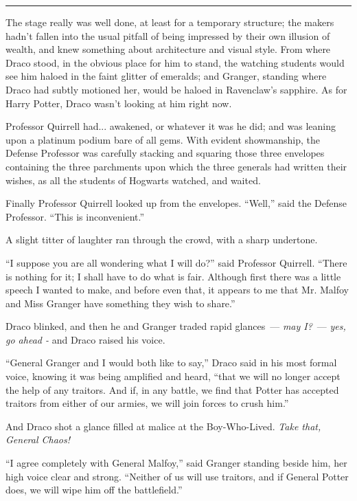 \begin{center}\rule{3in}{0.4pt}\end{center}

The stage really was well done, at least for a temporary structure; the makers hadn't fallen into the usual pitfall of being impressed by their own illusion of wealth, and knew something about architecture and visual style. From where Draco stood, in the obvious place for him to stand, the watching students would see him haloed in the faint glitter of emeralds; and Granger, standing where Draco had subtly motioned her, would be haloed in Ravenclaw's sapphire. As for Harry Potter, Draco wasn't looking at him right now.

Professor Quirrell had... awakened, or whatever it was he did; and was leaning upon a platinum podium bare of all gems. With evident showmanship, the Defense Professor was carefully stacking and squaring those three envelopes containing the three parchments upon which the three generals had written their wishes, as all the students of Hogwarts watched, and waited.

Finally Professor Quirrell looked up from the envelopes. ``Well,'' said the Defense Professor. ``This is inconvenient.''

A slight titter of laughter ran through the crowd, with a sharp undertone.

``I suppose you are all wondering what I will do?'' said Professor Quirrell. ``There is nothing for it; I shall have to do what is fair. Although first there was a little speech I wanted to make, and before even that, it appears to me that Mr. Malfoy and Miss Granger have something they wish to share.''

Draco blinked, and then he and Granger traded rapid glances~--- \emph{may I?}~--- \emph{yes, go ahead -} and Draco raised his voice.

``General Granger and I would both like to say,'' Draco said in his most formal voice, knowing it was being amplified and heard, ``that we will no longer accept the help of any traitors. And if, in any battle, we find that Potter has accepted traitors from either of our armies, we will join forces to crush him.''

And Draco shot a glance filled at malice at the Boy-Who-Lived. \emph{Take that, General Chaos!}

``I agree completely with General Malfoy,'' said Granger standing beside him, her high voice clear and strong. ``Neither of us will use traitors, and if General Potter does, we will wipe him off the battlefield.''

